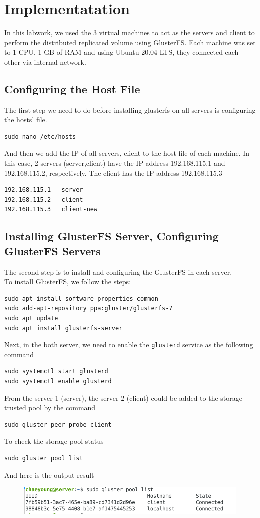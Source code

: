 \documentclass[times, 10pt]{thesisMDH}
\begin{document}
\titlePage

\newpage

\mainmatter

\section{Implementatation}
In this labwork, we used the 3 virtual machines to act as the servers and client to perform the distributed replicated volume using GlusterFS. Each machine was set to 1 CPU, 1 GB of RAM and using Ubuntu 20.04 LTS, they connected each other via internal network.
\subsection{Configuring the Host File}
The first step we need to do before installing glusterfs on all servers is configuring the hosts’ file.
\begin{lstlisting}
sudo nano /etc/hosts
\end{lstlisting}
And then we add the IP of all servers, client to the host file of each machine. In this case, 2 servers (server,client) have the IP address 192.168.115.1 and 192.168.115.2, respectively. The client has the IP address 192.168.115.3
\begin{lstlisting}
192.168.115.1   server
192.168.115.2	client
192.168.115.3	client-new
\end{lstlisting}

\subsection{Installing GlusterFS Server, Configuring GlusterFS Servers}
The second step is to install and configuring the GlusterFS in each server.\\
To install GlusterFS, we follow the steps:
\begin{lstlisting}
sudo apt install software-properties-common
sudo add-apt-repository ppa:gluster/glusterfs-7
sudo apt update
sudo apt install glusterfs-server
\end{lstlisting}
Next, in the both server, we need to enable the \texttt{glusterd} service as the following command
\begin{lstlisting}
sudo systemctl start glusterd
sudo systemctl enable glusterd
\end{lstlisting}
From the server 1 (server), the server 2 (client) could be added to the storage trusted pool by the command
\begin{lstlisting}
sudo gluster peer probe client
\end{lstlisting}
To check the storage pool status
\begin{lstlisting}
sudo gluster pool list
\end{lstlisting}
And here is the output result
\begin{figure}[H]
    \centering
    \includegraphics[width=0.7\linewidth]{images/cap1.png}
\end{figure}
\end{document}
